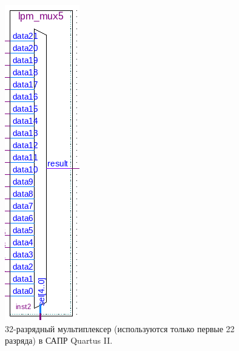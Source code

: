 \begin{figure}
  \begin{center}
    \includegraphics[scale=0.6]{./mux.png}
    \caption{32-разрядный мультиплексер (используются только первые 22 разряда) в САПР Quartus II.}
    \label{fig:mux}
  \end{center}
\end{figure}